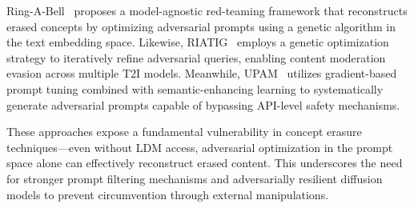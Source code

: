 Ring-A-Bell~\cite{Tsai2023RingABellHR} proposes a model-agnostic red-teaming framework that reconstructs erased concepts by optimizing adversarial prompts using a genetic algorithm in the text embedding space. Likewise, RIATIG~\cite{Liu2023RIATIGRA} employs a genetic optimization strategy to iteratively refine adversarial queries, enabling content moderation evasion across multiple T2I models. 
Meanwhile, UPAM~\cite{Peng2024UPAMUP} utilizes gradient-based prompt tuning combined with semantic-enhancing learning to systematically generate adversarial prompts capable of bypassing API-level safety mechanisms.

These approaches expose a fundamental vulnerability in concept erasure techniques—even without LDM access, adversarial optimization in the prompt space alone can effectively reconstruct erased content. This underscores the need for stronger prompt filtering mechanisms and adversarially resilient diffusion models to prevent circumvention through external manipulations.





